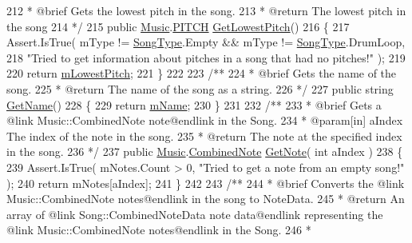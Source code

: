 \begin{DoxyCodeInclude}
212 \textcolor{comment}{     * @brief Gets the lowest pitch in the song.}
213 \textcolor{comment}{     * @return The lowest pitch in the song}
214 \textcolor{comment}{    */}
215     \textcolor{keyword}{public} \hyperlink{class_music}{Music}.\hyperlink{group___music_enums_ga508f69b199ea518f935486c990edac1d}{PITCH} \hyperlink{group___song_pub_func_gae4e71c8eb059cc9cf0b77e78971ab326}{GetLowestPitch}()
216     \{
217         Assert.IsTrue( mType != \hyperlink{group___song_enums_gae681a1f001333e39fc1cb4fea97bfe1b}{SongType}.Empty && mType != \hyperlink{group___song_enums_gae681a1f001333e39fc1cb4fea97bfe1b}{SongType}.DrumLoop,
218             \textcolor{stringliteral}{"Tried to get information about pitches in a song that had no pitches!"} );
219 
220         \textcolor{keywordflow}{return} \hyperlink{group___song_priv_var_ga293976ef4c2050687a81edfbf77b4fc1}{mLowestPitch};
221     \}
222 \textcolor{comment}{}
223 \textcolor{comment}{    /** }
224 \textcolor{comment}{     * @brief Gets the name of the song.}
225 \textcolor{comment}{     * @return The name of the song as a string.}
226 \textcolor{comment}{    */}
227     \textcolor{keyword}{public} \textcolor{keywordtype}{string} \hyperlink{group___song_pub_func_ga705c433f2bfb5aede337698144b23c8b}{GetName}()
228     \{
229         \textcolor{keywordflow}{return} \hyperlink{group___song_priv_var_ga6a5e6c1e4aa92939e2b5c1e3d9908df8}{mName};
230     \}
231 \textcolor{comment}{}
232 \textcolor{comment}{    /**}
233 \textcolor{comment}{     * @brief Gets a @link Music::CombinedNote note@endlink in the Song.}
234 \textcolor{comment}{     * @param[in] aIndex The index of the note in the song.}
235 \textcolor{comment}{     * @return The note at the specified index in the song. }
236 \textcolor{comment}{    */}
237     \textcolor{keyword}{public} \hyperlink{class_music}{Music}.\hyperlink{group___music_structs_struct_music_1_1_combined_note}{CombinedNote} \hyperlink{group___song_pub_func_ga485c83c9278103fed23c532bba1252f0}{GetNote}( \textcolor{keywordtype}{int} aIndex )
238     \{
239         Assert.IsTrue( mNotes.Count > 0, \textcolor{stringliteral}{"Tried to get a note from an empty song!"} );
240         \textcolor{keywordflow}{return} mNotes[aIndex];
241     \}
242 \textcolor{comment}{}
243 \textcolor{comment}{    /**}
244 \textcolor{comment}{     * @brief Converts the @link Music::CombinedNote notes@endlink in the song to NoteData.}
245 \textcolor{comment}{     * @return An array of @link Song::CombinedNoteData note data@endlink representing the @link
       Music::CombinedNote notes@endlink in the Song.}
246 \textcolor{comment}{     * }

\end{DoxyCodeInclude}

